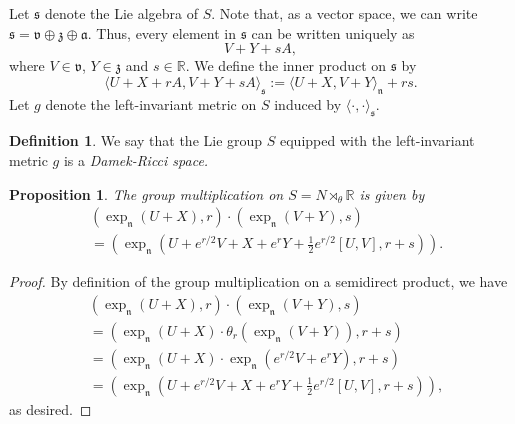 \documentclass{amsart}
\newcommand{\R}{\mathbb R}
\newcommand{\s}{\mathfrak s}
\renewcommand{\v}{\mathfrak v}
\newcommand{\z}{\mathfrak z}
\newcommand{\n}{\mathfrak n}
\renewcommand{\a}{\mathfrak a}
\theoremstyle{plain}
\newtheorem{proposition}[theorem]{Proposition}
\theoremstyle{definition}
\newtheorem{definition}[theorem]{Definition}
\theoremstyle{remark}
\begin{document}
	Let $\s$ denote the Lie algebra of $S$. Note that, as a vector space, we can write $\s = \v \oplus \z \oplus \a$. Thus, every element in $\s$ can be written uniquely as $$V + Y  + sA,$$ where $V \in \v$, $Y \in \z$ and $s \in \R$.
	We define the inner product on $\s$ by 
	\begin{equation}
		\langle U + X + rA, V + Y + sA \rangle_{\s} := \langle U + X, V + Y  \rangle_{\n} + rs.
	\end{equation}
	Let $g$ denote the left-invariant metric on $S$ induced by $\langle \cdot,\cdot \rangle_{\mathfrak s}$.
	
	\begin{definition}
		We say that the Lie group $S$ equipped with the left-invariant metric $g$ is a \emph{Damek-Ricci space.}
	\end{definition}

	
	 \begin{proposition}
	 	The group multiplication on $S = N \rtimes_\theta \R$ is given by
	 	\begin{align*}
	 		&(\exp_{\n}(U+X),r) \cdot (\exp_{\n}(V+Y),s)  \\
	 		&= \left( \exp_{\n}\left(U + e^{r/2} V + X + e^r Y+ \frac12 e^{r/2}[U,V], r+s\right)\right).
	 	\end{align*}
	 \end{proposition}
	 \begin{proof}
	 	By definition of the group multiplication on a semidirect product, we have 
	 	\begin{align*}
	 		&(\exp_\n(U+X),r) \cdot (\exp_\n(V+Y), s) \\
	 		&= \left( \exp_\n(U+X) \cdot \theta_r\left(\exp_\n(V+Y)\right), r + s\right) \\
	 		&= \left( \exp_\n(U+X) \cdot\exp_\n(e^{r/2}V + e^r Y), r + s\right) \\
	 		&=\left( \exp_{\n}\left(U + e^{r/2} V + X + e^r Y+ \frac12 e^{r/2}[U,V], r+s\right)\right),
	 	\end{align*}
 		as desired.
	 \end{proof}
 	
\end{document}
